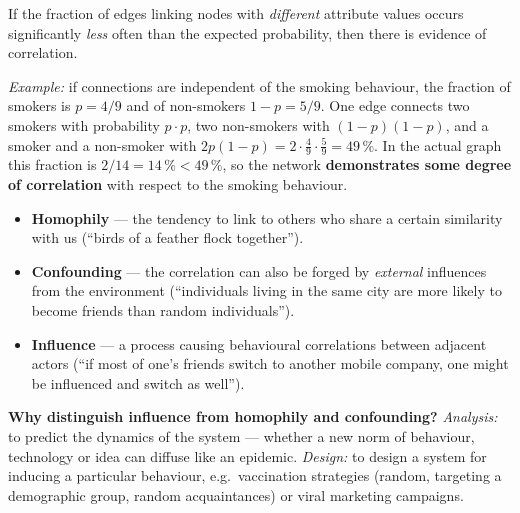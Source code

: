 \documentclass[11pt,a4paper]{article}
\theoremstyle{definition}
\providecommand{\uv}[1]{``#1''}
\begin{document}
\begin{defbox}
If the fraction of edges linking nodes with \emph{different} attribute values occurs significantly
\emph{less} often than the expected probability, then there is evidence of correlation.

\emph{Example:} if connections are independent of the smoking behaviour, the fraction of smokers is
$p=4/9$ and of non-smokers $1-p=5/9$. One edge connects two smokers with probability $p\cdot p$, two
non-smokers with $(1-p)(1-p)$, and a smoker and a non-smoker with
$2p(1-p)=2\cdot\frac49\cdot\frac59=49\,\%$. In the actual graph this fraction is
$2/14=14\,\%<49\,\%$, so the network \textbf{demonstrates some degree of correlation} with respect to
the smoking behaviour.
\end{defbox}

\begin{defbox}
\begin{itemize}
\item \textbf{Homophily} --- the tendency to link to others who share a certain similarity with us
      (\uv{birds of a feather flock together}).
\item \textbf{Confounding} --- the correlation can also be forged by \emph{external} influences from
      the environment (\uv{individuals living in the same city are more likely to become friends than
      random individuals}).
\item \textbf{Influence} --- a process causing behavioural correlations between adjacent actors
      (\uv{if most of one's friends switch to another mobile company, one might be influenced and
      switch as well}).
\end{itemize}
\textbf{Why distinguish influence from homophily and confounding?} \emph{Analysis:} to predict the
dynamics of the system --- whether a new norm of behaviour, technology or idea can diffuse like an
epidemic. \emph{Design:} to design a system for inducing a particular behaviour, e.g.\ vaccination
strategies (random, targeting a demographic group, random acquaintances) or viral marketing campaigns.
\end{defbox}
\end{document}

